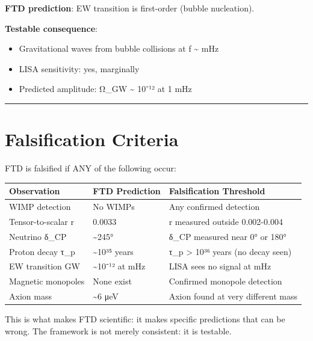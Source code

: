 \documentclass[
  11pt,
  letterpaper,
  twoside,
  openany]{book}
\makeatletter
\providecommand{\tightlist}{%
  \setlength{\itemsep}{0pt}\setlength{\parskip}{0pt}}
\let\orig@section\section
\renewcommand{\section}{\needspace{8\baselineskip}\orig@section}
\makeatother
\begin{document}
\textbf{FTD prediction}: EW transition is first-order (bubble
nucleation).

\textbf{Testable consequence}:

\begin{itemize}
\tightlist
\item
  Gravitational waves from bubble collisions at f \textasciitilde{} mHz
\item
  LISA sensitivity: yes, marginally
\item
  Predicted amplitude: Ω\_GW \textasciitilde{} 10⁻¹² at 1 mHz
\end{itemize}

\begin{center}\rule{0.5\linewidth}{0.5pt}\end{center}

\section{Falsification Criteria}\label{falsification-criteria-1}

FTD is falsified if ANY of the following occur:

\begin{longtable}[]{@{}lll@{}}
\toprule\noalign{}
Observation & FTD Prediction & Falsification Threshold \\
\midrule\noalign{}
\endhead
\bottomrule\noalign{}
\endlastfoot
WIMP detection & No WIMPs & Any confirmed detection \\
Tensor-to-scalar r & 0.0033 & r measured outside 0.002-0.004 \\
Neutrino δ\_CP & \textasciitilde245° & δ\_CP measured near 0° or 180° \\
Proton decay τ\_p & \textasciitilde10³⁵ years & τ\_p \textgreater{} 10³⁶
years (no decay seen) \\
EW transition GW & \textasciitilde10⁻¹² at mHz & LISA sees no signal at
mHz \\
Magnetic monopoles & None exist & Confirmed monopole detection \\
Axion mass & \textasciitilde6 μeV & Axion found at very different
mass \\
\end{longtable}

\begin{tcolorbox}[enhanced jigsaw, colbacktitle=quarto-callout-important-color!10!white, titlerule=0mm, bottomtitle=1mm, bottomrule=.15mm, colback=white, arc=.35mm, breakable, toprule=.15mm, title=\textcolor{quarto-callout-important-color}{\faExclamation}\hspace{0.5em}{Scientific Status}, rightrule=.15mm, coltitle=black, leftrule=.75mm, colframe=quarto-callout-important-color-frame, toptitle=1mm, opacityback=0, opacitybacktitle=0.6, left=2mm]

This is what makes FTD scientific: it makes specific predictions that
can be wrong. The framework is not merely consistent: it is testable.

\end{tcolorbox}
\end{document}
